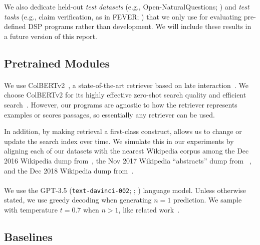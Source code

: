 We also dedicate held-out \textit{test datasets} (e.g., Open-NaturalQuestions; \citealt{kwiatkowski2019natural}) and \textit{test tasks} (e.g., claim verification, as in FEVER; \citealt{thorne2018fever}) that we only use for evaluating pre-defined DSP programs rather than development. We will include these results in a future version of this report.




\subsection{Pretrained Modules}

\paragraph{\RM{}} We use ColBERTv2~\cite{santhanam-etal-2022-colbertv2}, a state-of-the-art retriever based on late interaction~\cite{khattab2020colbert}. We choose ColBERTv2 for its highly effective zero-shot search quality and efficient search~\cite{santhanam2022plaid}. %
However, our \DSP{} programs are agnostic to how the retriever represents examples or scores passages, so essentially any retriever can be used.

In addition, by making retrieval a first-class construct, \DSP allows us to change or update the search index over time. We simulate this in our experiments by aligning each of our datasets with the nearest Wikipedia corpus among the Dec 2016 Wikipedia dump from~\citealt{chen2017reading}, the Nov 2017 Wikipedia ``abstracts'' dump from ~\citealt{yang2018hotpotqa}, and the Dec 2018 Wikipedia dump from~\citealt{karpukhin2020dense}.



\paragraph{\LM{}} We use the GPT-3.5 (\texttt{text-davinci-002}; \citealt{brown2020language}; \citealt{ouyang2022training}) language model. Unless otherwise stated, we use greedy decoding when generating $n=1$ prediction. We sample with temperature $t=0.7$ when $n>1$, like related work~\cite{wang2022self}. %






\subsection{Baselines}
\label{sec:eval:baselines}

